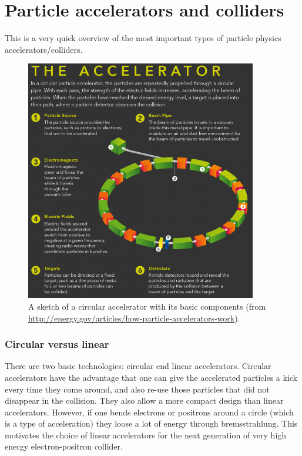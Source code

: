 \section{Particle accelerators and colliders}
This is a very quick overview of the most important types of particle
physics accelerators/colliders.

\begin{figure}[!h]
\centering
\includegraphics[width=0.9\textwidth]{fig/accelerators/0_CircularAccelerator}
\caption{A sketch of a circular accelerator with its basic components (from \href{http://energy.gov/articles/how-particle-accelerators-work}{http://energy.gov/articles/how-particle-accelerators-work}).
\label{fig:my_label}}
\end{figure}

\subsubsection{Circular versus linear}
There are two basic technologies: circular end linear accelerators. Circular accelerators have the advantage that one can give the accelerated particles a kick every time they come around, and also re-use those particles that did not disappear in the collision. They also allow a more compact design than linear accelerators. However, if one bends electrons or positrons around a circle (which is a type of acceleration) they loose a lot of energy through bremsstrahlung. This motivates the choice of linear accelerators for the next generation of very high energy electron-positron collider.

